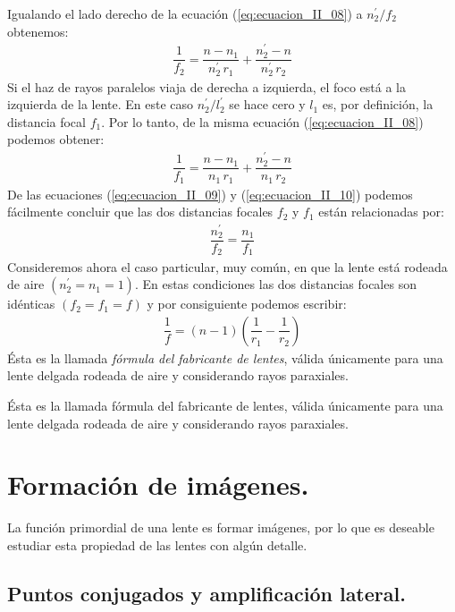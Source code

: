 \documentclass[14pt]{extarticle}
\begin{document}
Igualando el lado derecho de la ecuación (\ref{eq:ecuacion_II_08}) a $n_{2}^{\prime}/f_{2}$ obtenemos:
\begin{align}
\dfrac{1}{f_{2}} = \dfrac{n - n_{1}}{n_{2}^{\prime} \, r_{1}} + \dfrac{n_{2}^{\prime} - n}{n_{2}^{\prime} \, r_{2}}
\label{eq:ecuacion_II_09}
\end{align}
Si el haz de rayos paralelos viaja de derecha a izquierda, el foco está a la izquierda de la lente. En este caso $n_{2}^{\prime}/l_{2}^{\prime}$ se hace cero y $l_{1}$ es, por definición, la distancia
focal $f_{1}$. Por lo tanto, de la misma ecuación (\ref{eq:ecuacion_II_08}) podemos obtener:
\begin{align}
\dfrac{1}{f_{1}} = \dfrac{n - n_{1}}{n_{1} \, r_{1}} + \dfrac{n_{2}^{\prime} - n}{n_{1} \, r_{2}}
\label{eq:ecuacion_II_10}
\end{align}
De las ecuaciones (\ref{eq:ecuacion_II_09}) y (\ref{eq:ecuacion_II_10}) podemos fácilmente concluir que las dos distancias focales $f_{2}$ y $f_{1}$ están relacionadas por:
\begin{align}
\dfrac{n_{2}^{\prime}}{f_{2}} = \dfrac{n_{1}}{f_{1}}
\label{eq:ecuacion_II_11}
\end{align}
Consideremos ahora el caso particular, muy común, en que la lente está rodeada de aire $(n_{2}^{\prime} = n_{1} = 1)$. En estas condiciones las dos distancias focales son idénticas $(f_{2} = f_{1} = f)$ y por consiguiente podemos escribir:
\begin{align}
\dfrac{1}{f} = (n -1) \left( \dfrac{1}{r_{1}} - \dfrac{1}{r_{2}} \right)
\label{eq:ecuacion_II_12}
\end{align}
Ésta es la llamada \textit{fórmula del fabricante de lentes}, válida únicamente para una lente delgada rodeada de aire y considerando rayos paraxiales.

Ésta es la llamada fórmula del fabricante de lentes, válida únicamente para una
lente delgada rodeada de aire y considerando rayos paraxiales.

\section{Formación de imágenes.}

La función primordial de una lente es formar imágenes, por lo que es deseable estudiar esta propiedad de las lentes con algún detalle.

\subsection{Puntos conjugados y amplificación lateral.}
\end{document}
